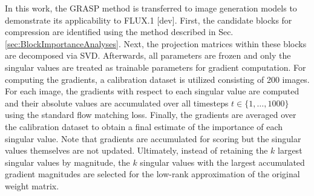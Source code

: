  In this work, the \gls{GRASP} method is transferred to image generation models to demonstrate its applicability to FLUX.1 {[dev]}. First, the candidate blocks for compression are identified using the method described in Sec. \ref{sec:BlockImportanceAnalyses}. Next, the projection matrices within these blocks are decomposed via \gls{SVD}. Afterwards, all parameters are frozen and only the singular values are treated as trainable parameters for gradient computation. For computing the gradients, a calibration dataset is utilized consisting of 200 images. For each image, the gradients with respect to each singular value are computed and their absolute values are accumulated over all timesteps $t \in \{1,\dots,1000\}$ using the standard flow matching loss. Finally, the gradients are averaged over the calibration dataset to obtain a final estimate of the importance of each singular value. Note that gradients are accumulated for scoring but the singular values themselves are not updated. Ultimately, instead of retaining the $k$ largest singular values by magnitude, the $k$ singular values with the largest accumulated gradient magnitudes are selected for the low-rank approximation of the original weight matrix. 
%
%
%
%


